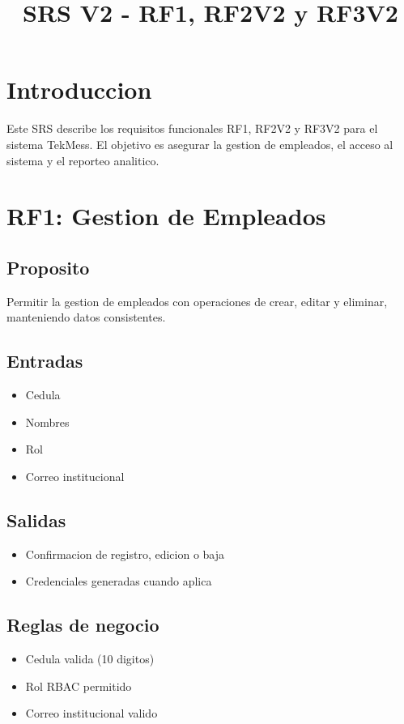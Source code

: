 \documentclass[12pt]{article}
\title{SRS V2 - RF1, RF2V2 y RF3V2}
\author{}
\date{}
\begin{document}
\maketitle

\section{Introduccion}
Este SRS describe los requisitos funcionales RF1, RF2V2 y RF3V2 para el sistema TekMess. El objetivo es asegurar la gestion de empleados, el acceso al sistema y el reporteo analitico.

\section{RF1: Gestion de Empleados}
\subsection{Proposito}
Permitir la gestion de empleados con operaciones de crear, editar y eliminar, manteniendo datos consistentes.

\subsection{Entradas}
\begin{itemize}
  \item Cedula
  \item Nombres
  \item Rol
  \item Correo institucional
\end{itemize}

\subsection{Salidas}
\begin{itemize}
  \item Confirmacion de registro, edicion o baja
  \item Credenciales generadas cuando aplica
\end{itemize}

\subsection{Reglas de negocio}
\begin{itemize}
  \item Cedula valida (10 digitos)
  \item Rol RBAC permitido
  \item Correo institucional valido
\end{itemize}
\end{document}
